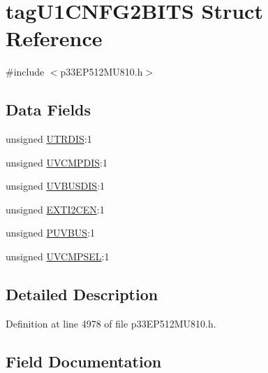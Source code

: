 \hypertarget{structtag_u1_c_n_f_g2_b_i_t_s}{}\section{tag\+U1\+C\+N\+F\+G2\+B\+I\+TS Struct Reference}
\label{structtag_u1_c_n_f_g2_b_i_t_s}


{\ttfamily \#include $<$p33\+E\+P512\+M\+U810.\+h$>$}

\subsection*{Data Fields}
\begin{DoxyCompactItemize}
\item 
unsigned \hyperlink{structtag_u1_c_n_f_g2_b_i_t_s_a5b409bf4889e46c39035fd714c7576c2}{U\+T\+R\+D\+IS}\+:1
\item 
unsigned \hyperlink{structtag_u1_c_n_f_g2_b_i_t_s_a12e30041e1e8340c90e43f0768784eac}{U\+V\+C\+M\+P\+D\+IS}\+:1
\item 
unsigned \hyperlink{structtag_u1_c_n_f_g2_b_i_t_s_ad27fab9d4ecaad6839ceee22556dfdd1}{U\+V\+B\+U\+S\+D\+IS}\+:1
\item 
unsigned \hyperlink{structtag_u1_c_n_f_g2_b_i_t_s_ae69f91a2cbd3f735f1d221fbea061320}{E\+X\+T\+I2\+C\+EN}\+:1
\item 
unsigned \hyperlink{structtag_u1_c_n_f_g2_b_i_t_s_a28cf5fcf8200dcb0150621634344772e}{P\+U\+V\+B\+US}\+:1
\item 
unsigned \hyperlink{structtag_u1_c_n_f_g2_b_i_t_s_a98c9d1d96926affd76c0fd386d8abb68}{U\+V\+C\+M\+P\+S\+EL}\+:1
\end{DoxyCompactItemize}


\subsection{Detailed Description}


Definition at line 4978 of file p33\+E\+P512\+M\+U810.\+h.



\subsection{Field Documentation}
\mbox{\label{structtag_u1_c_n_f_g2_b_i_t_s_ae69f91a2cbd3f735f1d221fbea061320}} 
